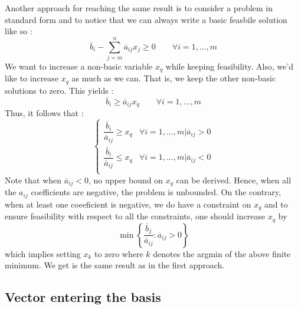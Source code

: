 Another approach for reaching the same result is to consider a problem in standard form and to notice that we can always write a basic feasbile solution like so : 
\[ \overline b_i - \sum_{j=m}^{n} \overline a_{ij}x_j \ge 0 \qquad\forall i = 1,...,m \]
We want to increase a non-basic variable $x_q$ while keeping feasibility. Also, we'd like to increase $x_q$ as much as we can. That is, we keep the other non-basic solutions to zero. This yields :
\[ \overline b_i \ge \overline a_{ij}x_q\qquad\forall i=1,...,m \]
Thus, it follows that :
\[
    \begin{cases}
        \dfrac{\overline b_i}{\overline a_{ij}} \ge x_q & \forall i = 1,...,m | \overline a_{ij} > 0\\
        \dfrac{\overline b_i}{\overline a_{ij}} \le x_q & \forall i = 1,...,m | \overline a_{ij} < 0\\
    \end{cases}
\]
Note that when $\overline a_{ij} < 0$, no upper bound on $x_q$ can be derived. Hence, when all the $a_{ij}$ coefficients are negative, the problem is unbounded. On the contrary, when at least one coeeficient is negative, we do have a constraint on $x_q$ and to ensure feasibility with respect to all the constraints, one should increase $x_q$ by \[ \min\left\{ \frac{\overline b_j}{\overline a_{ij}} : \overline a_{ij} > 0 \right\} \] which implies setting $x_k$ to zero where $k$ denotes the argmin of the above finite minimum. We get is the same result as in the first approach. 

\subsection{Vector entering the basis}

